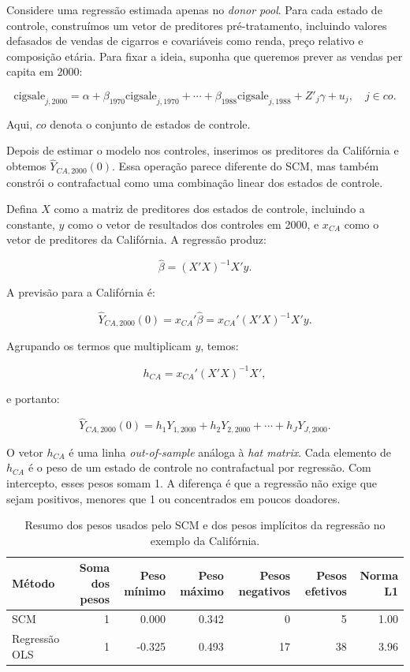 \documentclass[
]{article}
\begin{document}
Considere uma regressão estimada apenas no \emph{donor pool}. Para cada estado de controle, construímos um vetor de preditores pré-tratamento, incluindo valores defasados de vendas de cigarros e covariáveis como renda, preço relativo e composição etária. Para fixar a ideia, suponha que queremos prever as vendas per capita em 2000:

\[
\text{cigsale}_{j,2000}
= \alpha
+ \beta_{1970}\text{cigsale}_{j,1970}
+ \cdots
+ \beta_{1988}\text{cigsale}_{j,1988}
+ Z'_j\gamma
+ u_j,
\quad j \in co.
\]

Aqui, \(co\) denota o conjunto de estados de controle.

Depois de estimar o modelo nos controles, inserimos os preditores da Califórnia e obtemos \(\widehat{Y}_{CA,2000}(0)\). Essa operação parece diferente do SCM, mas também constrói o contrafactual como uma combinação linear dos estados de controle.

Defina \(X\) como a matriz de preditores dos estados de controle, incluindo a constante, \(y\) como o vetor de resultados dos controles em 2000, e \(x_{CA}\) como o vetor de preditores da Califórnia. A regressão produz:

\[
\widehat{\beta} = (X'X)^{-1}X'y.
\]

A previsão para a Califórnia é:

\[
\widehat{Y}_{CA,2000}(0)
= x_{CA}'\widehat{\beta}
= x_{CA}'(X'X)^{-1}X'y.
\]

Agrupando os termos que multiplicam \(y\), temos:

\[
h_{CA} = x_{CA}'(X'X)^{-1}X',
\]

e portanto:

\[
\widehat{Y}_{CA,2000}(0)
= h_1Y_{1,2000} + h_2Y_{2,2000} + \cdots + h_JY_{J,2000}.
\]

O vetor \(h_{CA}\) é uma linha \emph{out-of-sample} análoga à \emph{hat matrix}. Cada elemento de \(h_{CA}\) é o peso de um estado de controle no contrafactual por regressão. Com intercepto, esses pesos somam 1. A diferença é que a regressão não exige que sejam positivos, menores que 1 ou concentrados em poucos doadores.

\begin{table}

\caption{\label{tab:tabela-pesos-regressao-scm}Resumo dos pesos usados pelo SCM e dos pesos implícitos da regressão no exemplo da Califórnia.}
\centering
\begin{tabular}[t]{l|r|r|r|r|r|r}
\hline
Método & Soma dos pesos & Peso mínimo & Peso máximo & Pesos negativos & Pesos efetivos & Norma L1\\
\hline
SCM & 1 & 0.000 & 0.342 & 0 & 5 & 1.00\\
\hline
Regressão OLS & 1 & -0.325 & 0.493 & 17 & 38 & 3.96\\
\hline
\end{tabular}
\end{table}
\end{document}

